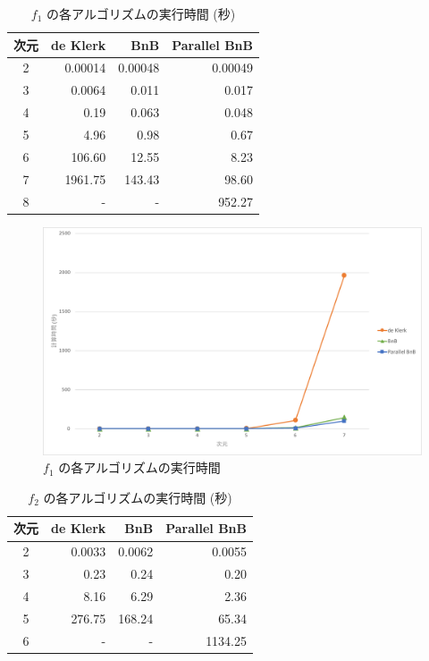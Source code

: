 \documentclass[a4paper,11pt]{jreport}
\begin{document}
\newpage

\begin{table}[h]
\caption{$ f_1 $ の各アルゴリズムの実行時間 (秒)}
\label{tbl:f_1_table}
\begin{center}
\begin{tabular}{|c|r|r|r|} \hline
次元 & de Klerk & BnB & Parallel BnB \\ \hline
2 & 0.00014 & 0.00048 & 0.00049 \\
3 & 0.0064 & 0.011 & 0.017 \\
4 & 0.19 & 0.063 & 0.048 \\
5 & 4.96 & 0.98 & 0.67 \\ 
6 & 106.60 & 12.55 & 8.23 \\
7 & 1961.75 & 143.43 & 98.60 \\
8 & - & - & 952.27 \\ \hline
\end{tabular}
\end{center}
\end{table}

\begin{figure}[h]
\begin{center}
\includegraphics[width=15cm]{graphs/f_1_time.pdf}
\caption{$ f_1 $ の各アルゴリズムの実行時間}
\label{fig:f_1_time}
\end{center}
\end{figure}

\newpage

\begin{table}[h]
\caption{$ f_2 $ の各アルゴリズムの実行時間 (秒)}
\label{tbl:f_2_table}
\begin{center}
\begin{tabular}{|c|r|r|r|} \hline
次元 & de Klerk & BnB & Parallel BnB \\ \hline
2 & 0.0033 & 0.0062 & 0.0055 \\
3 & 0.23 & 0.24 & 0.20 \\
4 & 8.16 & 6.29 & 2.36 \\
5 & 276.75 & 168.24 & 65.34 \\ 
6 & - & - & 1134.25 \\ \hline
\end{tabular}
\end{center}
\end{table}
\end{document}

